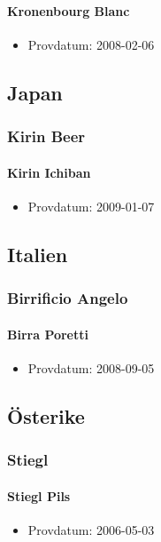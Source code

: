 \documentclass[11pt]{article}
\begin{document}
\paragraph{Kronenbourg Blanc}
\label{sec:org33c4d80}
\begin{itemize}
\item Provdatum: 2008-02-06
\end{itemize}
\subsection{Japan}
\label{sec:orgd7aec47}
\subsubsection{Kirin Beer}
\label{sec:org872f5d4}
\paragraph{Kirin Ichiban}
\label{sec:org9195066}
\begin{itemize}
\item Provdatum: 2009-01-07
\end{itemize}
\subsection{Italien}
\label{sec:org17c5465}
\subsubsection{Birrificio Angelo}
\label{sec:org684cd1e}
\paragraph{Birra Poretti}
\label{sec:orgd35a345}
\begin{itemize}
\item Provdatum: 2008-09-05
\end{itemize}
\subsection{Österike}
\label{sec:orgc5ccf6c}
\subsubsection{Stiegl}
\label{sec:org9ee3ffe}
\paragraph{Stiegl Pils}
\label{sec:orgb246954}
\begin{itemize}
\item Provdatum: 2006-05-03
\end{itemize}
\end{document}
